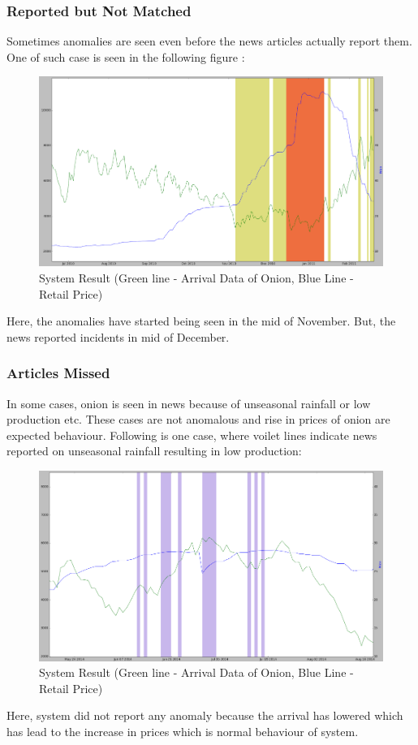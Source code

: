 \documentclass[a4paper,10pt]{article}
\begin{document}
\subsubsection{Reported but Not Matched}
Sometimes anomalies are seen even before the news articles actually report them. One of such case is seen in the following figure :
\begin{figure}[H]
\centering
\includegraphics[width=1.1\textwidth]{graphs/ReportedNotMatched.png}
\caption{System Result (Green line - Arrival Data of Onion, Blue Line - Retail Price)}
\label{fig:localExample}
\end{figure}

Here, the anomalies have started being seen in the mid of November. But, the news reported incidents in mid of December. 
\subsubsection{Articles Missed}
In some cases, onion is seen in news because of unseasonal rainfall or low production etc. These cases are not anomalous and rise in prices of onion are expected behaviour. Following is one case, where voilet lines indicate news reported on unseasonal rainfall resulting in low production:

\begin{figure}[H]
\centering
\includegraphics[width=1.1\textwidth]{graphs/MissedAnomaly.png}
\caption{System Result (Green line - Arrival Data of Onion, Blue Line - Retail Price)}
\label{fig:localExample}
\end{figure}

Here, system did not report any anomaly because the arrival has lowered which has lead to the increase in prices which is normal behaviour of system. 
\end{document}
